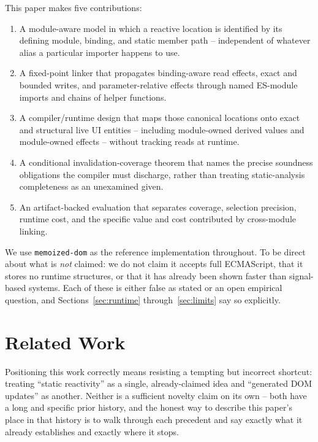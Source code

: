 \documentclass[conference]{IEEEtran}
\begin{document}
This paper makes five contributions:

\begin{enumerate}
  \item A module-aware model in which a reactive location is identified by
  its defining module, binding, and static member path -- independent of
  whatever alias a particular importer happens to use.
  \item A fixed-point linker that propagates binding-aware read effects,
  exact and bounded writes, and parameter-relative effects through named
  ES-module imports and chains of helper functions.
  \item A compiler/runtime design that maps those canonical locations onto
  exact and structural live UI entities -- including module-owned derived
  values and module-owned effects -- without tracking reads at runtime.
  \item A conditional invalidation-coverage theorem that names the precise
  soundness obligations the compiler must discharge, rather than treating
  static-analysis completeness as an unexamined given.
  \item An artifact-backed evaluation that separates coverage, selection
  precision, runtime cost, and the specific value and cost contributed by
  cross-module linking.
\end{enumerate}

We use \texttt{memoized-dom} as the reference implementation throughout. To
be direct about what is \emph{not} claimed: we do not claim it accepts full
ECMAScript, that it stores no runtime structures, or that it has already been
shown faster than signal-based systems. Each of these is either false as
stated or an open empirical question, and Sections~\ref{sec:runtime}
through~\ref{sec:limits} say so explicitly.

\section{Related Work}
\label{sec:related}

Positioning this work correctly means resisting a tempting but incorrect
shortcut: treating ``static reactivity'' as a single, already-claimed idea
and ``generated DOM updates'' as another. Neither is a sufficient novelty
claim on its own -- both have a long and specific prior history, and the
honest way to describe this paper's place in that history is to walk through
each precedent and say exactly what it already establishes and exactly where
it stops.
\end{document}
